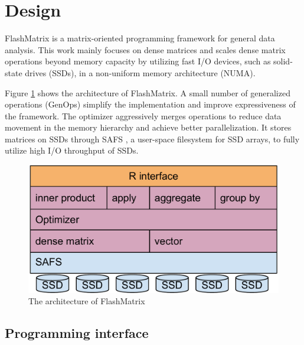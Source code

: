 \vspace{-10pt}
\section{Design}
\vspace{-5pt}

FlashMatrix is a matrix-oriented programming framework for general data analysis.
This work mainly focuses on dense matrices and scales dense matrix operations
beyond memory capacity by utilizing fast I/O devices, such as solid-state drives
(SSDs), in a non-uniform memory architecture (NUMA).

Figure \ref{fig:arch} shows the architecture of FlashMatrix. 
A small number of generalized operations (GenOps)
simplify the implementation and improve expressiveness of
the framework. The optimizer aggressively merges operations to
reduce data movement in the memory hierarchy and achieve better parallelization.
It stores matrices on SSDs through SAFS \cite{safs},
a user-space filesystem for SSD arrays, to fully utilize high I/O
throughput of SSDs.

\begin{figure}
\centering
\includegraphics[scale=0.3]{FlashMatrix_figs/architecture.pdf}
\vspace{-2pt}
\caption{The architecture of FlashMatrix}
\label{fig:arch}
\end{figure}

\vspace{-8pt}
\subsection{Programming interface}
\vspace{-4pt}


